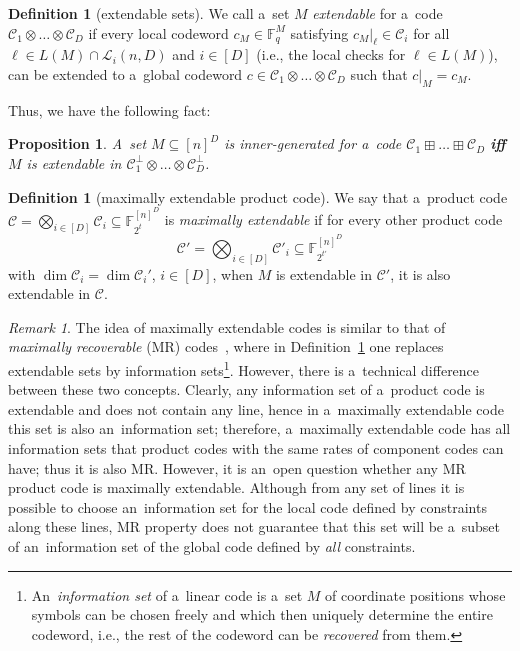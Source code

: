 \documentclass[conference]{IEEEtran}
\newcommand{\Iff}{\textbf{if\textcompwordmark f} }
\theoremstyle{plain}
\newtheorem{proposition}[theorem]{Proposition}
\theoremstyle{definition}
\newtheorem{definition}[theorem]{Definition}
\theoremstyle{remark}
\newtheorem{remark}[theorem]{Remark}
\newcommand{\cC}{\mathcal{C}}
\newcommand{\cL}{\mathcal{L}}
\newcommand{\F}{\mathbb{F}}
\begin{document}
\begin{definition}[extendable sets]
We call a~set $M$ \emph{extendable} for a~code $\cC_1\otimes\ldots\otimes \cC_D$ if every local codeword $c_M \in \F_q^M$ satisfying $c_M|_\ell \in \cC_i$ for all $\ell\in L(M)\cap \cL_i(n, D)$ and $i\in [D]$ (i.e., the local checks for $\ell \in L(M)$), can be extended to a~global codeword $c\in \cC_1\otimes\ldots\otimes \cC_D$ such that $c|_M = c_M$.    
\end{definition}


Thus, we have the following fact:
\begin{proposition}\label{pr:1}
    A~set $M\subseteq [n]^D$ is inner-generated for a~code $\cC_1\boxplus\ldots\boxplus \cC_D$ \Iff $M$ is extendable in $\cC_1^\perp\otimes\ldots\otimes \cC_D^\perp$.
\end{proposition}


\begin{definition}[maximally extendable product code]\label{def:ME}
We say that a~product code $\cC=\bigotimes_{i\in [D]} \cC_i \subseteq \F_{2^t}^{[n]^D}$ is \emph{maximally extendable} if for every other product code 
\[\cC' = \bigotimes_{i\in [D]} \cC'_i \subseteq \F_{2^{t'}}^{[n]^D}\] with $\dim \cC_i = \dim \cC_i'$, $i\in[D]$, when $M$ is extendable in $\cC'$, it is also extendable in $\cC$. 
\end{definition}

\begin{remark}
    The idea of maximally extendable codes is similar to that of \emph{maximally recoverable} (MR) codes~\cite{chenMaximallyRecoverableProperty2007, gopalanExplicitMaximallyRecoverable2014}, where in Definition~\ref{def:ME} one replaces extendable sets by information sets\footnote{An~\emph{information set} of a~linear code is a~set $M$ of coordinate positions whose symbols can be chosen freely and which then uniquely determine the entire codeword, i.e., the rest of the codeword can be \emph{recovered} from them.}. However, there is a~technical difference between these two concepts. Clearly, any information set of a~product code is extendable and does not contain any line, hence in a~maximally extendable code this set is also an~information set; therefore, a~maximally extendable code has all information sets that product codes with the same rates of component codes can have; thus it is also MR. However, it is an~open question whether any MR product code is maximally extendable. Although from any set of lines it is possible to choose an~information set for the local code defined by constraints along these lines, MR property does not guarantee that this set will be a~subset of an~information set of the global code defined by \emph{all} constraints.
\end{remark}
\end{document}
